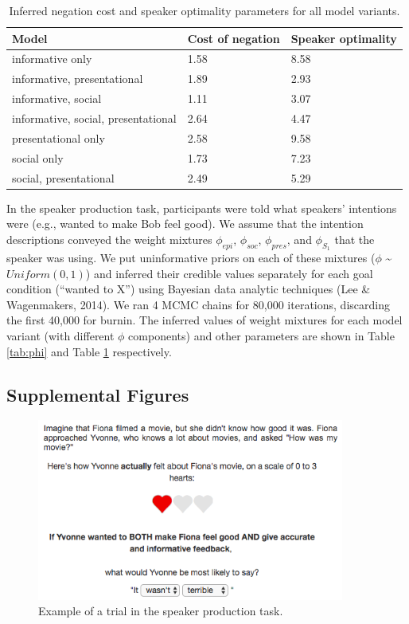 \documentclass[floatsintext,man]{apa6}
\theoremstyle{definition}
\theoremstyle{definition}
\theoremstyle{definition}
\theoremstyle{remark}
\begin{document}
\begin{table}[tbp]
\begin{center}
\begin{threeparttable}
\caption{\label{tab:otherParams}Inferred negation cost and speaker optimality parameters for all model variants.}
\begin{tabular}{lll}
\toprule
Model & \multicolumn{1}{c}{Cost of negation} & \multicolumn{1}{c}{Speaker optimality}\\
\midrule
informative only & 1.58 & 8.58\\
informative, presentational & 1.89 & 2.93\\
informative, social & 1.11 & 3.07\\
informative, social, presentational & 2.64 & 4.47\\
presentational only & 2.58 & 9.58\\
social only & 1.73 & 7.23\\
social, presentational & 2.49 & 5.29\\
\bottomrule
\end{tabular}
\end{threeparttable}
\end{center}
\end{table}

In the speaker production task, participants were told what speakers'
intentions were (e.g., wanted to make Bob feel good). We assume that the
intention descriptions conveyed the weight mixtures \(\phi_{epi}\),
\(\phi_{soc}\), \(\phi_{pres}\), and \(\phi_{S_1}\) that the speaker was
using. We put uninformative priors on each of these mixtures (\(\phi\)
\textasciitilde{} \(Uniform(0,1)\)) and inferred their credible values
separately for each goal condition (\enquote{wanted to X}) using
Bayesian data analytic techniques (Lee \& Wagenmakers, 2014). We ran 4
MCMC chains for 80,000 iterations, discarding the first 40,000 for
burnin. The inferred values of weight mixtures for each model variant
(with different \(\phi\) components) and other parameters are shown in
Table \ref{tab:phi} and Table \ref{tab:otherParams} respectively.

\newpage

\subsection{Supplemental Figures}\label{supplemental-figures}

\begin{figure}[!h]
\includegraphics[width=3.98in]{fig/screenshot} \caption{Example of a trial in the speaker production task.}\label{fig:screenshot}
\end{figure}
\end{document}
